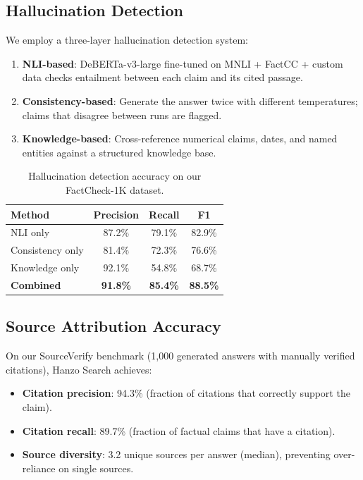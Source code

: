 \subsection{Hallucination Detection}

We employ a three-layer hallucination detection system:

\begin{enumerate}[leftmargin=1.4em]
    \item \textbf{NLI-based}: DeBERTa-v3-large fine-tuned on MNLI + FactCC + custom data checks entailment between each claim and its cited passage.
    \item \textbf{Consistency-based}: Generate the answer twice with different temperatures; claims that disagree between runs are flagged.
    \item \textbf{Knowledge-based}: Cross-reference numerical claims, dates, and named entities against a structured knowledge base.
\end{enumerate}

\begin{table}[H]
\centering
\small
\begin{tabular}{lccc}
\toprule
\textbf{Method} & \textbf{Precision} & \textbf{Recall} & \textbf{F1} \\
\midrule
NLI only & 87.2\% & 79.1\% & 82.9\% \\
Consistency only & 81.4\% & 72.3\% & 76.6\% \\
Knowledge only & 92.1\% & 54.8\% & 68.7\% \\
\textbf{Combined} & \textbf{91.8\%} & \textbf{85.4\%} & \textbf{88.5\%} \\
\bottomrule
\end{tabular}
\caption{Hallucination detection accuracy on our FactCheck-1K dataset.}
\label{tab:hallucination}
\end{table}

\subsection{Source Attribution Accuracy}

On our SourceVerify benchmark (1,000 generated answers with manually verified citations), Hanzo Search achieves:

\begin{itemize}[leftmargin=1.1em]
    \item \textbf{Citation precision}: 94.3\% (fraction of citations that correctly support the claim).
    \item \textbf{Citation recall}: 89.7\% (fraction of factual claims that have a citation).
    \item \textbf{Source diversity}: 3.2 unique sources per answer (median), preventing over-reliance on single sources.
\end{itemize}

